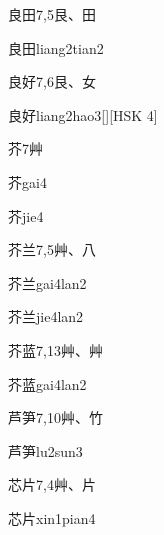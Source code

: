 \begin{entry}{良田}{7,5}{⾉、⽥}
  \begin{phonetics}{良田}{liang2tian2}
  \end{phonetics}
\end{entry}

\begin{entry}{良好}{7,6}{⾉、⼥}
  \begin{phonetics}{良好}{liang2hao3}[][HSK 4]
  \end{phonetics}
\end{entry}

\begin{entry}{芥}{7}{⾋}
  \begin{phonetics}{芥}{gai4}
  \end{phonetics}
  \begin{phonetics}{芥}{jie4}
  \end{phonetics}
\end{entry}

\begin{entry}{芥兰}{7,5}{⾋、⼋}
  \begin{phonetics}{芥兰}{gai4lan2}
  \end{phonetics}
  \begin{phonetics}{芥兰}{jie4lan2}
  \end{phonetics}
\end{entry}

\begin{entry}{芥蓝}{7,13}{⾋、⾋}
  \begin{phonetics}{芥蓝}{gai4lan2}
  \end{phonetics}
\end{entry}

\begin{entry}{芦笋}{7,10}{⾋、⽵}
  \begin{phonetics}{芦笋}{lu2sun3}
  \end{phonetics}
\end{entry}

\begin{entry}{芯片}{7,4}{⾋、⽚}
  \begin{phonetics}{芯片}{xin1pian4}
  \end{phonetics}
\end{entry}

